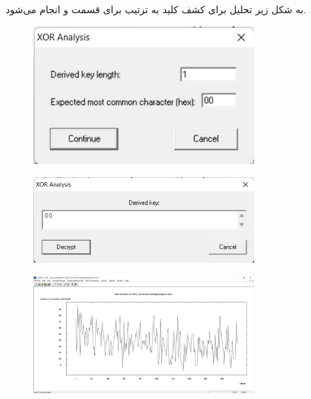 \documentclass{article}
\begin{document}
\subsubsection{}
به شکل زیر تحلیل برای کشف کلید  به ترتیب برای قسمت  و  انجام می‌شود.
\begin{figure}[H]
    \centering
    \includegraphics[width=0.75\textwidth]{figures/5ca.jpg}
    \caption
	{}
    \label{fig:fig1}
\end{figure}
\begin{figure}[H]
    \centering
    \includegraphics[width=0.75\textwidth]{figures/5cb.jpg}
    \caption
	{}
    \label{fig:fig1}
\end{figure}
\begin{figure}[H]
    \centering
    \includegraphics[width=0.75\textwidth]{figures/5cc.jpg}
    \caption
	{}
    \label{fig:fig1}
\end{figure}
\end{document}
